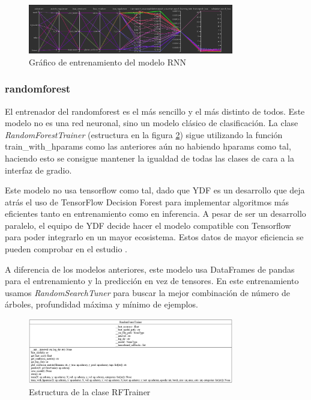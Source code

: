 \begin{figure}[H]
    \centering
    \includegraphics[width=0.8\textwidth]{Imagenes/Bitmap/tb-rnn-0.8.png}
    \caption{Gráfico de entrenamiento del modelo RNN}
    \label{fig:rnn-0.8-grafico-ejemplo}
\end{figure}

\subsubsection{\gls{randomforest}}

El entrenador del \gls{randomforest} es el más sencillo y el más distinto de todos. Este modelo no es una red neuronal, sino un modelo clásico de clasificación. La clase \textit{RandomForestTrainer} (estructura en la figura \ref{fig:rf-estructura}) sigue utilizando la función train\_with\_hparams como las anteriores aún no habiendo hparams como tal, haciendo esto se consigue mantener la igualdad de todas las clases de cara a la interfaz de gradio.

Este modelo no usa tensorflow como tal, dado que YDF es un desarrollo que deja atrás el uso de TensorFlow Decision Forest para implementar algoritmos más eficientes tanto en entrenamiento como en inferencia. A pesar de ser un desarrollo paralelo, el equipo de YDF decide hacer el modelo compatible con Tensorflow para poder integrarlo en un mayor ecosistema. Estos datos de mayor eficiencia se pueden comprobar en el estudio \cite{GBBSP23}.

A diferencia de los modelos anteriores, este modelo usa DataFrames de pandas para el entrenamiento y la predicción en vez de tensores. En este entrenamiento usamos \textit{RandomSearchTuner} para buscar la mejor combinación de número de árboles, profundidad máxima y mínimo de ejemplos.

\begin{figure}[H]
    \centering
    \includegraphics[width=0.8\textwidth]{Imagenes/Bitmap/classes_RandomForestTrainer.png}
    \caption{Estructura de la clase RFTrainer}
    \label{fig:rf-estructura}
\end{figure}

